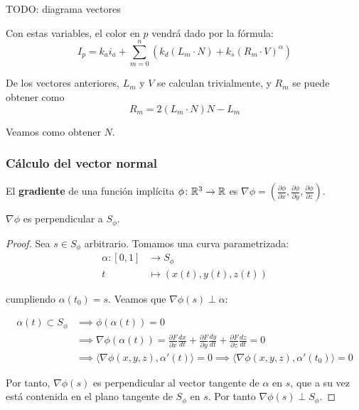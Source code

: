 TODO: diagrama vectores

Con estas variables, el color en $p$ vendrá dado por la fórmula:
\begin{equation*}
  I_p = k_a i_a + \sum_{m=0}^{n} \left(k_d\left(L_m\cdot N\right) + k_s\left(R_m\cdot V\right)^{\alpha} \right)
\end{equation*}

De los vectores anteriores, $L_m$ y $V$ se calculan trivialmente, y $R_m$ se puede obtener como
\begin{equation*}
  R_m = 2(L_m\cdot N)N - L_m
\end{equation*}

Veamos como obtener $N$.

\subsubsection{Cálculo del vector normal}
\begin{definicion}
  El \textbf{gradiente} de una función implícita $\phi\colon \mathbb{R}^3\to\mathbb{R}$ es $\nabla\phi = \left(\frac{\partial \phi}{\partial x}, \frac{\partial \phi}{\partial y}, \frac{\partial \phi}{\partial z}\right)$.
\end{definicion}

\begin{proposicion}\label{p:gradient_perp}
  $\nabla\phi$ es perpendicular a $S_\phi$.
\end{proposicion}

\begin{proof}
  Sea $s\in S_\phi$ arbitrario. Tomamos una curva parametrizada:
  \begin{align*}
    \alpha \colon [0,1] & \to S_\phi                             \\
    t                   & \mapsto \left(x(t), y(t), z(t) \right)
  \end{align*}

  cumpliendo $\alpha(t_0)=s$. Veamos que $\nabla\phi(s) \perp \alpha$:

  \begin{align*}
    \alpha(t)\subset S_\phi & \implies \phi(\alpha(t))=0\\
                            & \implies \nabla\phi(\alpha(t)) = \frac{\partial{F}}{\partial{x}}\frac{dx}{dt} + \frac{\partial{F}}{\partial{y}}\frac{dy}{dt} + \frac{\partial{F}}{\partial{z}}\frac{dz}{dt} = 0 \\
                            & \implies \langle \nabla\phi(x,y,z), \alpha'(t)\rangle = 0 \implies \langle \nabla\phi(x,y,z), \alpha'(t_0)\rangle = 0
  \end{align*}

    Por tanto, $\nabla\phi(s)$ es perpendicular al vector tangente de $\alpha$ en $s$, que a su vez está contenida en el plano tangente de $S_\phi$ en $s$. Por tanto $\nabla\phi(s) \perp S_\phi$.
\end{proof}

